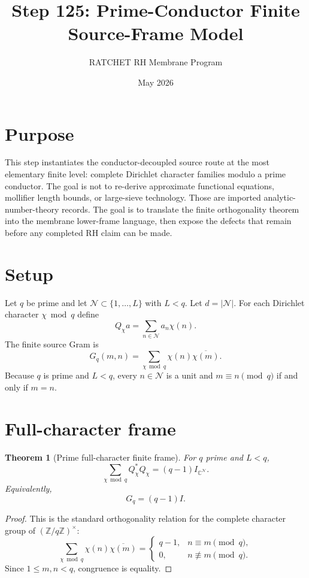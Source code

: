 \documentclass[11pt]{article}
\title{Step 125: Prime-Conductor Finite Source-Frame Model}
\author{RATCHET RH Membrane Program}
\date{May 2026}
\newtheorem{theorem}{Theorem}
\begin{document}
\maketitle

\section{Purpose}
This step instantiates the conductor-decoupled source route at the most elementary finite level: complete Dirichlet character families modulo a prime conductor.  The goal is not to re-derive approximate functional equations, mollifier length bounds, or large-sieve technology.  Those are imported analytic-number-theory records.  The goal is to translate the finite orthogonality theorem into the membrane lower-frame language, then expose the defects that remain before any completed RH claim can be made.

\section{Setup}
Let $q$ be prime and let $\mathcal N\subset\{1,\ldots,L\}$ with $L<q$.  Let $d=|\mathcal N|$.  For each Dirichlet character $\chi\bmod q$ define
\[
Q_\chi a=\sum_{n\in\mathcal N}a_n\chi(n).
\]
The finite source Gram is
\[
G_q(m,n)=\sum_{\chi\bmod q}\chi(n)\overline{\chi(m)}.
\]
Because $q$ is prime and $L<q$, every $n\in\mathcal N$ is a unit and $m\equiv n\pmod q$ if and only if $m=n$.

\section{Full-character frame}
\begin{theorem}[Prime full-character finite frame]
For $q$ prime and $L<q$,
\[
\sum_{\chi\bmod q} Q_\chi^*Q_\chi=(q-1)I_{\mathbb C^{\mathcal N}}.
\]
Equivalently,
\[
G_q=(q-1)I.
\]
\end{theorem}

\begin{proof}
This is the standard orthogonality relation for the complete character group of $(\mathbb Z/q\mathbb Z)^\times$:
\[
\sum_{\chi\bmod q}\chi(n)\overline{\chi(m)}=
\begin{cases}
q-1,& n\equiv m\pmod q,\\
0,& n\not\equiv m\pmod q.
\end{cases}
\]
Since $1\le m,n<q$, congruence is equality.
\end{proof}
\end{document}
